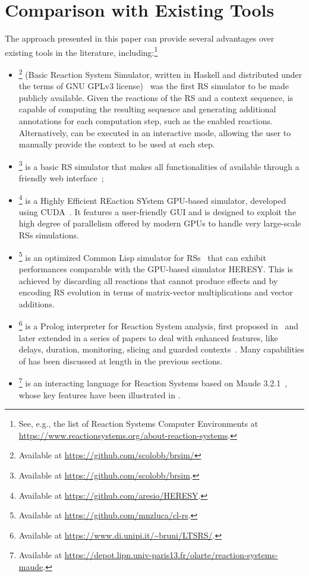 
\section{Comparison with Existing Tools}\label{sec:related}

The approach presented in this paper can provide several advantages over existing tools in the literature, including:\footnote{See, e.g., the list of Reaction Systems Computer Environments at \url{https://www.reactionsystems.org/about-reaction-systems}.}
\begin{itemize}
\item
\brsim\footnote{Available at \url{https://github.com/scolobb/brsim/}} (Basic Reaction System Simulator, written in Haskell and distributed under the terms of GNU GPLv3 license)~\cite{DBLP:journals/tcs/AzimiGIP15} was the first RS simulator to be made publicly available. 
Given the reactions of the RS and a context sequence, \brsim is capable of computing the resulting sequence and generating additional annotations for each computation step, such as the enabled reactions.
Alternatively, \brsim can be executed in an interactive mode, allowing the user to manually provide the context to be used at each step.
\item
\WebRSim\footnote{Available at \url{https://github.com/scolobb/brsim}.} is a basic RS simulator that makes all functionalities of  \brsim available through a friendly web interface~\cite{DBLP:conf/birthday/0001RAP18};
\item 
\HERESY\footnote{Available at \url{https://github.com/aresio/HERESY}.} is a Highly Efficient REaction SYstem GPU-based simulator, developed using CUDA~\cite{DBLP:journals/fuin/NobilePSMCMB17}. It features a user-friendly GUI and is designed to exploit the high degree of parallelism offered by modern GPUs to handle very large-scale RSs simulations.
\item
\clrs\footnote{Available at \url{https://github.com/mnzluca/cl-rs}.} is an optimized Common Lisp simulator for RSs~\cite{DBLP:journals/fuin/FerrettiLMP20} that can exhibit performances comparable with the GPU-based simulator \textsf{HERESY}. This is achieved by discarding all reactions that cannot produce effects and by encoding RS evolution in terms of matrix-vector multiplications and vector additions.
\item 
\BioResolve\footnote{Available at \url{https://www.di.unipi.it/~bruni/LTSRS/}.} is a Prolog interpreter for Reaction System analysis, first proposed in~\cite{DBLP:journals/tcs/BrodoBF21} and later extended in a series of papers to deal with enhanced features, like delays, duration, monitoring, slicing and guarded contexts~\cite{DBLP:journals/nca/BrodoBFGLM23,DBLP:journals/nc/BrodoBF24,DBLP:conf/cmsb/BowlesBBFGM24}. Many capabilities of \BioResolve has been discussed at length in the previous sections.
\item
\ccReact\footnote{Available at \url{https://depot.lipn.univ-paris13.fr/olarte/reaction-systems-maude}.} is an interacting language for Reaction Systems based on Maude 3.2.1~\cite{DBLP:conf/cmsb/BallisBFO24}, whose key features have been illustrated in .
\end{itemize}

